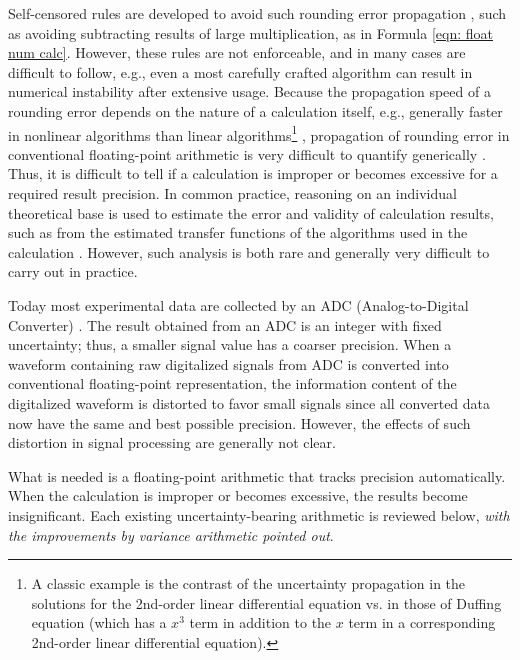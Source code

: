 \documentclass[twoside]{article}
\numberwithin{equation}{section}
\begin{document}
Self-censored rules are developed to avoid such rounding error propagation \cite{Numerical_Recipes}\cite{Precise_Numerical_Methods}, such as avoiding subtracting results of large multiplication, as in Formula \eqref{eqn: float num calc}.  
However, these rules are not enforceable, and in many cases are difficult to follow, e.g., even a most carefully crafted algorithm can result in numerical instability after extensive usage.  
Because the propagation speed of a rounding error depends on the nature of a calculation itself, e.g., generally faster in nonlinear algorithms than linear algorithms\footnote{A classic example is the contrast of the uncertainty propagation in the solutions for the 2nd-order linear differential equation vs. in those of Duffing equation (which has a $x^3$ term in addition to the $x$ term in a corresponding 2nd-order linear differential equation).} \cite{Chaotic_Dynamics}, propagation of rounding error in conventional floating-point arithmetic is very difficult to quantify generically \cite{Stochastic_Arithmetic}.  
Thus, it is difficult to tell if a calculation is improper or becomes excessive for a required result precision.  
In common practice, reasoning on an individual theoretical base is used to estimate the error and validity of calculation results, such as from the estimated transfer functions of the algorithms used in the calculation \cite{Numerical_Recipes}\cite{Error_Analysi_Digital_Filters}\cite{Floating-point_Digital_Filters}.  
However, such analysis is both rare and generally very difficult to carry out in practice.  

Today most experimental data are collected by an ADC (Analog-to-Digital Converter) \cite{Electronics}.  
The result obtained from an ADC is an integer with fixed uncertainty; thus, a smaller signal value has a coarser precision.  
When a waveform containing raw digitalized signals from ADC is converted into conventional floating-point representation, the information content of the digitalized waveform is distorted to favor small signals since all converted data now have the same and best possible precision.  
However, the effects of such distortion in signal processing are generally not clear.

What is needed is a floating-point arithmetic that tracks precision automatically.  
When the calculation is improper or becomes excessive, the results become insignificant.  
Each existing uncertainty-bearing arithmetic is reviewed below, \emph{with the improvements by variance arithmetic pointed out}. 
\end{document}
